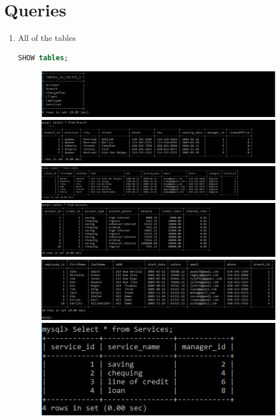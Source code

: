 \documentclass[letterpaper, 12pt]{article}
\begin{document}
\newpage
\section{Queries}

\begin{enumerate}[label=\arabic*.]
  \item All of the tables
    \begin{lstlisting}[language=sql]
SHOW tables;
  \end{lstlisting}
\begin{figure}[H]
  \centering
  \includegraphics[scale=0.6]{images/Query_1.PNG}
  \includegraphics[scale=0.5]{images/Query_1_1.PNG}
  \includegraphics[scale=0.5]{images/Query_1_2.PNG}
  \includegraphics[scale=0.5]{images/Query_1_3.PNG}
  \includegraphics[scale=0.5]{images/Query_1_5.PNG}
  \includegraphics[scale=0.6]{images/Query_1_4.PNG}

\end{figure}
\end{enumerate}
\end{document}
